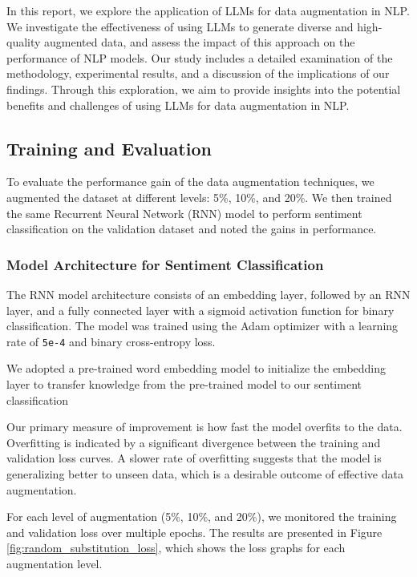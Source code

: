 \documentclass{article}
\newcommand{\code}[1]{\texttt{#1}}
\begin{document}
In this report, we explore the application of LLMs for data augmentation in
NLP. We investigate the effectiveness of using LLMs to generate diverse and
high-quality augmented data, and assess the impact of this approach on the
performance of NLP models. Our study includes a detailed examination of the
methodology, experimental results, and a discussion of the implications of our
findings. Through this exploration, we aim to provide insights into the
potential benefits and challenges of using LLMs for data augmentation in NLP.

\subsection{Training and Evaluation}

To evaluate the performance gain of the data augmentation techniques, we
augmented the dataset at different levels: 5\%, 10\%, and 20\%. We then trained
the same Recurrent Neural Network (RNN) model to perform sentiment
classification on the validation dataset and noted the gains in performance.

\subsubsection{Model Architecture for Sentiment Classification}

The RNN model architecture consists of an embedding layer, followed by an RNN
layer, and a fully connected layer with a sigmoid activation function for
binary classification. The model was trained using the Adam optimizer with a
learning rate of \code{5e-4} and binary cross-entropy loss.

We adopted a pre-trained word embedding model to initialize the embedding layer
to transfer knowledge from the pre-trained model to our sentiment classification

Our primary measure of improvement is how fast the model overfits to the data.
Overfitting is indicated by a significant divergence between the training and
validation loss curves. A slower rate of overfitting suggests that the model is
generalizing better to unseen data, which is a desirable outcome of effective
data augmentation.

For each level of augmentation (5\%, 10\%, and 20\%), we monitored the training
and validation loss over multiple epochs. The results are presented in Figure
\ref{fig:random_substitution_loss}, which shows the loss graphs for each
augmentation level.
\end{document}
